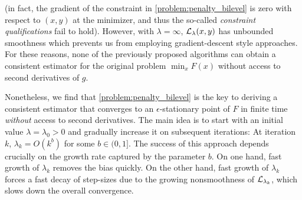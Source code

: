 (in fact, the gradient of the constraint in \eqref{problem:penalty_bilevel} is zero with respect to $(x,y)$ at the minimizer, and thus the so-called {\it constraint qualifications} \cite{wright1999numerical} fail to hold). %
However, with $\lambda=\infty$, $\mathcal{L}_{\lambda}(x,y)$ has unbounded smoothness which prevents us from employing gradient-descent style approaches. 
For these reasons, none of the previously proposed algorithms  can obtain a consistent estimator for the original problem $\min_x F(x)$ without access to second derivatives of $g$.

Nonetheless, we find that \eqref{problem:penalty_bilevel} is the key to deriving a consistent estimator that converges to an $\epsilon$-stationary point of $F$ in finite time {\it without} access to second derivatives. 
The main idea is to start with an initial value $\lambda=\lambda_0>0$ and gradually increase it on subsequent iterations: At iteration $k$,  $\lambda_k = O(k^b)$ for some $b \in (0, 1]$. 
The success of this approach depends crucially on the growth rate captured by the parameter $b$. 
On one hand, fast growth of $\lambda_k$  removes the bias quickly.
On the other hand, fast growth of $\lambda_k$ forces a fast decay of step-sizes due to the growing nonsmoothness  of $\mathcal{L}_{\lambda_k}$, which slows down the overall convergence. 


